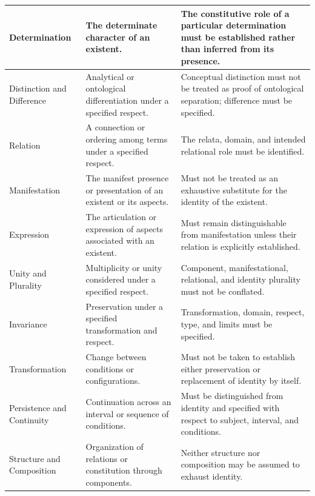 \begin{center}
\begin{longtable}{
    >{\raggedright\arraybackslash}p{}
    >{\raggedright\arraybackslash}p{}
    >{\raggedright\arraybackslash}p{}
}
Determination &
The determinate character of an existent. &
The constitutive role of a particular determination must be established rather than inferred from its presence.
\\ \hline

Distinction and Difference &
Analytical or ontological differentiation under a specified respect. &
Conceptual distinction must not be treated as proof of ontological separation; difference must be specified.
\\ \hline

Relation &
A connection or ordering among terms under a specified respect. &
The relata, domain, and intended relational role must be identified.
\\ \hline

Manifestation &
The manifest presence or presentation of an existent or its aspects. &
Must not be treated as an exhaustive substitute for the identity of the existent.
\\ \hline

Expression &
The articulation or expression of aspects associated with an existent. &
Must remain distinguishable from manifestation unless their relation is explicitly established.
\\ \hline

Unity and Plurality &
Multiplicity or unity considered under a specified respect. &
Component, manifestational, relational, and identity plurality must not be conflated.
\\ \hline

Invariance &
Preservation under a specified transformation and respect. &
Transformation, domain, respect, type, and limits must be specified.
\\ \hline

Transformation &
Change between conditions or configurations. &
Must not be taken to establish either preservation or replacement of identity by itself.
\\ \hline

Persistence and Continuity &
Continuation across an interval or sequence of conditions. &
Must be distinguished from identity and specified with respect to subject, interval, and conditions.
\\ \hline

Structure and Composition &
Organization of relations or constitution through components. &
Neither structure nor composition may be assumed to exhaust identity.
\\ \hline


\end{longtable}
\end{center}
